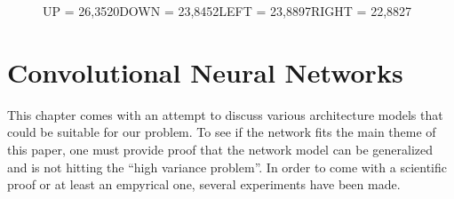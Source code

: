 \begin{figure}[hp]
  \caption{\newline UP = 97,6530\newline DOWN = 100,0000\newline LEFT = 93,8538\newline RIGHT = 92,5261}\label{fig:fb}
\endminipage\hfill
{}%
   \caption{\newline UP = 26,3520\newline DOWN = 23,8452\newline LEFT = 23,8897\newline RIGHT = 22,8827}\label{fig:fc}
 
\endminipage
\end{figure}

\newpage
\section{Convolutional Neural Networks}
This chapter comes with an attempt to discuss various architecture models that could be suitable for our problem. To see if the network fits the main theme of this paper, one must provide proof that the network model can be generalized and is not hitting the ``high variance problem''. In order to come with a scientific proof or at least an empyrical one, several experiments have been made.

